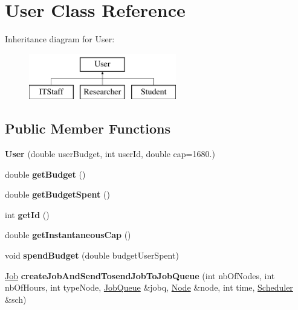 \hypertarget{class_user}{}\section{User Class Reference}
\label{class_user}
Inheritance diagram for User\+:\begin{figure}[H]
\begin{center}
\leavevmode
\includegraphics[height=2.000000cm]{class_user}
\end{center}
\end{figure}
\subsection*{Public Member Functions}
\begin{DoxyCompactItemize}
\item 
\mbox{\label{class_user_ac5bc283639864f3d7f88ede4f0a8a332}} 
{\bfseries User} (double user\+Budget, int user\+Id, double cap=1680.)
\item 
\mbox{\label{class_user_ae32aaa5d9ea260235599c9e4c4052046}} 
double {\bfseries get\+Budget} ()
\item 
\mbox{\label{class_user_aec39d775c97e0c9f0234f45892d61f0d}} 
double {\bfseries get\+Budget\+Spent} ()
\item 
\mbox{\label{class_user_a1e393732cd9838ab29445d9153333046}} 
int {\bfseries get\+Id} ()
\item 
\mbox{\label{class_user_a792d82405cd2fd41f8e8b377d3f74827}} 
double {\bfseries get\+Instantaneous\+Cap} ()
\item 
\mbox{\label{class_user_a842dee214d1c05758a362a5944b07cd1}} 
void {\bfseries spend\+Budget} (double budget\+User\+Spent)
\item 
\mbox{\label{class_user_adcbf63de0acbc62bbb3c717e7652a91c}} 
\mbox{\hyperlink{class_job}{Job}} {\bfseries create\+Job\+And\+Send\+Tosend\+Job\+To\+Job\+Queue} (int nb\+Of\+Nodes, int nb\+Of\+Hours, int type\+Node, \mbox{\hyperlink{class_job_queue}{Job\+Queue}} \&jobq, \mbox{\hyperlink{class_node}{Node}} \&node, int time, \mbox{\hyperlink{class_scheduler}{Scheduler}} \&sch)
\end{DoxyCompactItemize}
